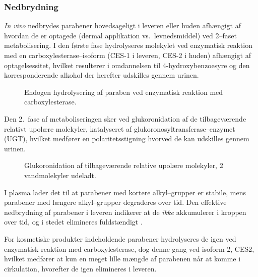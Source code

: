     \subsubsection{Nedbrydning}
    \textit{In vivo} nedbrydes parabener hovedsageligt i leveren eller huden afhængigt af hvordan de er optagede (dermal applikation vs.\ levnedsmiddel) ved 2--faset metabolisering. I den første fase hydrolyseres molekylet ved enzymatisk reaktion med en carboxylesterase--isoform (CES-1 i leveren, CES-2 i huden) afhængigt af optagelsessitet, hvilket resulterer i omdannelsen til 4-hydroxybenzoesyre og den korresponderende alkohol der herefter udskilles gennem urinen.
    \begin{figure}[H]
        \caption{Endogen hydrolysering af paraben ved enzymatisk reaktion med carboxylesterase.}
    \end{figure}
    Den 2.\ fase af metaboliseringen sker ved glukoronidation af de tilbageværende relativt upolære molekyler, katalyseret af glukoronosyltransferase--enzymet (UGT), hvilket medfører en polaritetsstigning hvorved de kan udskilles gennem urinen.
    \begin{figure}[H]
        \caption{Glukoronidation af tilbageværende relative upolære molekyler, 2 vandmolekyler udeladt.}
    \end{figure}
    I plasma lader det til at parabener med kortere alkyl--grupper er stabile, mens parabener med længere alkyl--grupper degraderes over tid. Den effektive nedbrydning af parabener i leveren indikerer at de \textit{ikke} akkumulerer i kroppen over tid, og i stedet elimineres fuldstændigt \parencite{Suza2010}.

    For kosmetiske produkter indeholdende parabener hydrolyseres de igen ved enzymatisk reaktion med carboxylesterase, dog denne gang ved isoform 2, CES2, hvilket medfører at kun en meget lille mængde af parabenen når at komme i cirkulation, hvorefter de igen elimineres i leveren.

